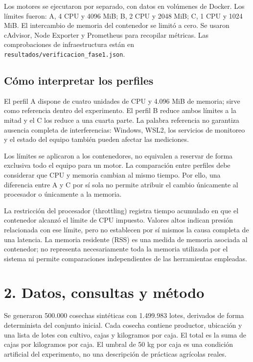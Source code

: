 \documentclass[12pt,letterpaper]{article}
\begin{document}
Los motores se ejecutaron por separado, con datos en volúmenes de Docker. Los límites fueron: A, 4 CPU y 4096 MiB; B, 2 CPU y 2048 MiB; C, 1 CPU y 1024 MiB. El intercambio de memoria del contenedor se limitó a cero. Se usaron cAdvisor, Node Exporter y Prometheus para recopilar métricas. Las comprobaciones de infraestructura están en \texttt{resultados/\allowbreak{}verificacion\_\allowbreak{}fase1.json}.


\subsection*{Cómo interpretar los perfiles}
El perfil A dispone de cuatro unidades de CPU y 4.096 MiB de memoria; sirve como referencia dentro del experimento. El perfil B reduce ambos límites a la mitad y el C los reduce a una cuarta parte. La palabra referencia no garantiza ausencia completa de interferencias: Windows, WSL2, los servicios de monitoreo y el estado del equipo también pueden afectar las mediciones.

Los límites se aplicaron a los contenedores, no equivalen a reservar de forma exclusiva todo el equipo para un motor. La comparación entre perfiles debe considerar que CPU y memoria cambian al mismo tiempo. Por ello, una diferencia entre A y C por sí sola no permite atribuir el cambio únicamente al procesador o únicamente a la memoria.

La restricción del procesador (throttling) registra tiempo acumulado en que el contenedor alcanzó el límite de CPU impuesto. Valores altos indican presión relacionada con ese límite, pero no establecen por sí mismos la causa completa de una latencia. La memoria residente (RSS) es una medida de memoria asociada al contenedor; no representa necesariamente toda la memoria utilizada por el sistema ni permite comparaciones independientes de las herramientas empleadas.

\section*{2. Datos, consultas y método}
Se generaron 500.000 cosechas sintéticas con 1.499.983 lotes, derivados de forma determinista del conjunto inicial. Cada cosecha contiene productor, ubicación y una lista de lotes con cultivo, cajas y kilogramos por caja. El total es la suma de cajas por kilogramos por caja. El umbral de 50 kg por caja es una condición artificial del experimento, no una descripción de prácticas agrícolas reales.
\end{document}
